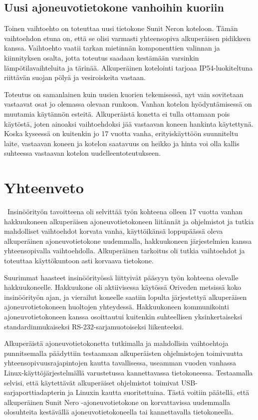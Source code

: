 \section{Uusi ajoneuvotietokone vanhoihin kuoriin}
Toinen vaihtoehto on toteuttaa uusi tietokone Sunit Neron koteloon. Tämän vaihtoehdon etuna on, että se olisi varmasti yhteensopiva alkuperäisen pidikkeen kanssa. Vaihtoehto vaatii tarkan mietinnän komponenttien valinnan ja kiinnityksen osalta, jotta toteutus saadaan kestämään varsinkin lämpötilavaihteluita ja tärinää. Alkuperäinen kotelointi tarjoaa IP54-luokiteltuna riittävän suojan pölyä ja vesiroiskeita vastaan.

Toteutus on samanlainen kuin uusien kuorien tekemisessä, nyt vain sovitetaan vastaavat osat jo olemassa olevaan runkoon. Vanhan kotelon hyödyntämisessä on muutamia käytännön esteitä. Alkuperäistä konetta ei tulla ottamaan pois käytöstä, joten ainoaksi vaihtoehdoksi jää vastaavan koneen hankinta käytettynä. Koska kyseessä on kuitenkin jo 17 vuotta vanha, erityiskäyttöön suunniteltu laite, vastaavan koneen ja kotelon saatavuus on heikko ja hinta voi olla kallis suhteessa vastaavan kotelon uudelleentoteutukseen.

\newpage

\chapter{Yhteenveto}\
Insinöörityön tavoitteena oli selvittää työn kohteena olleen 17 vuotta vanhan hakkuukoneen alkuperäisen ajoneuvotietokoneen liitännät ja ohjelmistot ja tutkia mahdolliset vaihtoehdot korvata vanha, käyttöikänsä loppupäässä oleva alkuperäinen ajoneuvotietokone uudemmalla, hakkuukoneen järjestelmien kanssa yhteensopivalla vaihtoehdolla. Alkuperäinen tarkoitus oli tutkia vaihtoehdot ja toteuttaa käyttökuntoon asti korvaava tietokone.

Suurimmat haasteet insinöörityössä liittyivät pääsyyn työn kohteena olevalle hakkuukoneelle. Hakkuukone oli aktiivisessa käytössä Oriveden metsissä koko insinöörityön ajan, ja vierailut koneelle saatiin lopulta järjestettyä alkuperäisen ajoneuvotietokoneen huoltojen yhteydessä. Hakkuukoneen kommunikointi ajoneuvotietokoneen kanssa osoittautui kuitenkin suhteellisen yksinkertaiseksi standardinmukaiseksi RS-232-sarjamuotoiseksi liikenteeksi.

Alkuperäistä ajoneuvotietokonetta tutkimalla ja mahdollisia vaihtoehtoja punnitsemalla päädyttiin testaamaan alkuperäisten ohjelmistojen toimivuutta yhteensopivuusrajapintojen kautta tavallisessa, useamman vuoden vanhassa Linux-käyttöjärjestelmällä varustetussa kannettavassa tietokoneessa. Testaamalla selvisi, että käytettävät alkuperäiset ohjelmistot toimivat USB-sarjaporttiadapterin ja Linuxin kautta suoritettuina. Tästä voitiin päätellä, että alkuperäinen Sunit Nero -ajoneuvotietokone on korvattavissa uudemmalla olosuhteita kestävällä ajoneuvotietokoneella tai kannettavalla tietokoneella.

